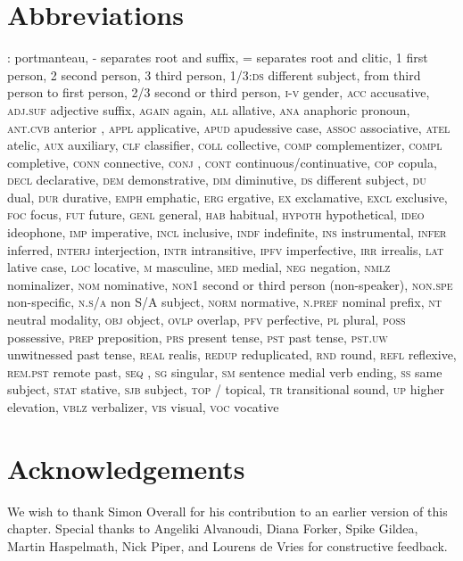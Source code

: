 \documentclass[output=paper]{LSP/langsci}
\begin{document}
\section*{Abbreviations}
\textsc{:}		portmanteau,
\textsc{-}		separates root and suffix,
\textsc{=}		separates root and clitic,
\textsc{1}		first person,
\textsc{2}		second person,
\textsc{3} 		third person,
\textsc{1/3:ds} 		different subject, from third person to first person,
\textsc{2/3} 		second or third person,
\textsc{i-v}		gender,
\textsc{acc}		accusative,
\textsc{adj.suf}		adjective suffix,
\textsc{again}		again,
\textsc{all}		allative,
\textsc{ana}		anaphoric pronoun,
\textsc{ant.cvb}	anterior ,
\textsc{appl}		applicative,
\textsc{apud}		apudessive case,
\textsc{assoc}		associative,
\textsc{atel}		atelic,
\textsc{aux}		auxiliary,
\textsc{clf}		classifier,
\textsc{coll}		collective,
\textsc{comp}		complementizer,
\textsc{compl}		completive,
\textsc{conn}		connective,
\textsc{conj}		,
\textsc{cont} continuous/continuative,
\textsc{cop} copula,
\textsc{decl} declarative,
\textsc{dem}		demonstrative,
\textsc{dim}		diminutive,
\textsc{ds}		different subject,
\textsc{du}		dual,
\textsc{dur} durative,
\textsc{emph}		emphatic,
\textsc{erg}		ergative,
\textsc{ex}									exclamative,
\textsc{excl}		exclusive,
\textsc{foc}		focus,
\textsc{fut}		future,
\textsc{genl}		general,
\textsc{hab}		habitual,
\textsc{hypoth}		hypothetical,
\textsc{ideo}		ideophone,
\textsc{imp}		imperative,
\textsc{incl}		inclusive,
\textsc{indf}		indefinite,
\textsc{ins}		instrumental,
\textsc{infer} inferred,
\textsc{interj} interjection,
\textsc{intr} intransitive,
\textsc{ipfv}		imperfective,
\textsc{irr	}									irrealis,
\textsc{lat}		lative case,
\textsc{loc}		locative,
\textsc{m}		masculine,
\textsc{med} medial,
\textsc{neg}		negation,
\textsc{nmlz}		nominalizer,
\textsc{nom}		nominative,
\textsc{non1}								second or third person (non-speaker),
\textsc{non.spe}		non-specific,
\textsc{n.s/a} non S/A subject,
\textsc{norm}		normative,
\textsc{n.pref}		nominal prefix,
\textsc{nt}		neutral modality,
\textsc{obj} object,
\textsc{ovlp} overlap,
\textsc{pfv} perfective,
\textsc{pl}		plural,
\textsc{poss}		possessive,
\textsc{prep}		preposition,
\textsc{prs}		present tense,
\textsc{pst}		past tense,
\textsc{pst.uw}		unwitnessed past tense,
\textsc{real} realis,
\textsc{redup}		reduplicated,
\textsc{rnd}		round,
\textsc{refl}		reflexive,
\textsc{rem.pst}		remote past,
\textsc{seq}	,
\textsc{sg}		singular,
\textsc{sm}		sentence medial verb ending,
\textsc{ss}		same subject,
\textsc{stat} stative,
\textsc{sjb}		subject,
\textsc{top}		 / topical, 
\textsc{tr}		transitional sound,
\textsc{up} higher elevation,
\textsc{vblz}	verbalizer,
\textsc{vis}	visual,
\textsc{voc}		vocative


\section*{Acknowledgements}
We wish to thank Simon Overall for his contribution to an earlier version of this chapter. Special thanks to Angeliki Alvanoudi, Diana Forker, Spike Gildea, Martin Haspelmath, Nick Piper, and Lourens de Vries for constructive feedback. 

\printbibliography[heading=subbibliography,notkeyword=this] 
\end{document}
